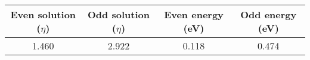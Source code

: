 \begin{center}
\begin{longtable}{|c|c|c|c|}
\hline 
Even solution ($\eta$) & Odd solution ($\eta$) & Even energy (eV) & Odd energy (eV)\\
\hline
\hline
1.460 & 2.922 & 0.118 & 0.474 \\
\hline
\end{longtable}
\end{center}
